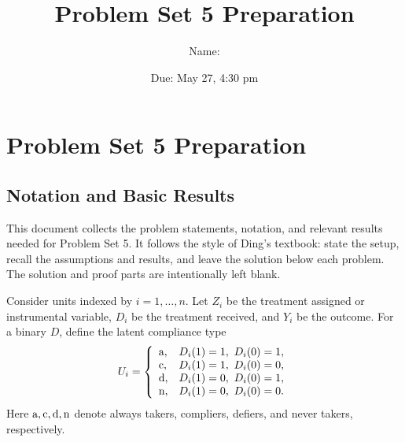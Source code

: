 \documentclass[krantz1]{krantz}
\title{Problem Set 5 Preparation}
\author{Name: \underline{\hspace{3cm}}}
\date{Due: May 27, 4:30 pm}
\def\at{\textup{a}}
\def\nt{\textup{n}}
\def\cp{\textup{c}}
\def\df{\textup{d}}
\begin{document}
\frontmatter

\maketitle
\tableofcontents

\mainmatter

\makeatletter
{}
\makeatother

\renewcommand {\theexample} {\thechapter.\arabic{example}}
\renewcommand {\theassumption} {\thechapter.\arabic{assumption}}
\renewcommand {\thelemma} {\thechapter.\arabic{lemma}}
\renewcommand {\thetheorem} {\thechapter.\arabic{theorem}}
\renewcommand {\theremark} {\thechapter.\arabic{remark}}
\renewcommand {\thecondition} {\thechapter.\arabic{condition}}
\renewcommand {\thecorollary} {\thechapter.\arabic{corollary}}
\renewcommand {\theproposition} {\thechapter.\arabic{proposition}}
\renewcommand {\thedefinition} {\thechapter.\arabic{definition}}

\chapter{Problem Set 5 Preparation}

\section{Notation and Basic Results}

This document collects the problem statements, notation, and relevant results
needed for Problem Set 5. It follows the style of Ding's textbook: state the
setup, recall the assumptions and results, and leave the solution below each
problem. The solution and proof parts are intentionally left blank.

Consider units indexed by \(i=1,\ldots,n\). Let \(Z_i\) be the treatment assigned
or instrumental variable, \(D_i\) be the treatment received, and \(Y_i\) be the
outcome. For a binary \(D\), define the latent compliance type
\[
U_i=\left\{
\begin{array}{ll}
\at, & D_i(1)=1,\ D_i(0)=1,\\
\cp, & D_i(1)=1,\ D_i(0)=0,\\
\df, & D_i(1)=0,\ D_i(0)=1,\\
\nt, & D_i(1)=0,\ D_i(0)=0.
\end{array}
\right.
\]
Here \(\at,\cp,\df,\nt\) denote always takers, compliers, defiers, and never
takers, respectively.
\end{document}
